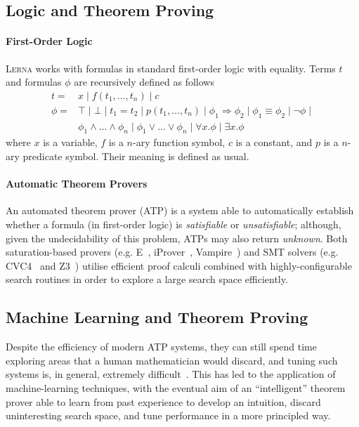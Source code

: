 \documentclass{llncs}
\newcommand{\lerna}{\textsc{Lerna}}
\begin{document}
\subsection{Logic and Theorem Proving}

\paragraph{First-Order Logic}

\lerna{} works with formulas in standard first-order logic with equality. Terms $t$ and formulas $\phi$ are recursively defined as follows
\[
\begin{array}{ll}
t = & x \mid f\left(t_1, \ldots, t_n\right) \mid c \\
\phi  =  & \top \mid \bot \mid t_1 = t_2 \mid p\left(t_1, \ldots, t_n\right) \mid \phi_1 \Rightarrow \phi_2 \mid \phi_1 \equiv \phi_2\mid \neg \phi \mid \\ &   \phi_1 \wedge \ldots \wedge \phi_n \mid \phi_1  \vee \ldots \vee \phi_n \mid \forall x. \phi \mid \exists x. \phi
\end{array}
\]
where $x$ is a variable, $f$ is a $n$-ary function symbol, $c$ is a constant, and $p$ is a $n$-ary predicate symbol. Their meaning is defined as usual.

\paragraph{Automatic Theorem Provers}
An automated theorem prover (ATP) is a system able to automatically establish whether a formula (in first-order logic) is \emph{satisfiable} or \emph{unsatisfiable}; although, given the undecidability of this problem, ATPs may also return \emph{unknown}. Both saturation-based provers (e.g. E~\cite{E}, iProver~\cite{iProver}, Vampire~\cite{Vampire}) and SMT solvers (e.g. CVC4~\cite{CVC4} and Z3~\cite{Z3}) utilise efficient proof calculi combined with highly-configurable search routines in order to explore a large search space efficiently.

\subsection{Machine Learning and Theorem Proving}
Despite the efficiency of modern ATP systems, they can still spend time exploring areas that a human mathematician would discard, and tuning such systems is, in general, extremely difficult~\cite{portfolio}.
This has led to the application of machine-learning techniques, with the eventual aim of an ``intelligent'' theorem prover able to learn from past experience to develop an intuition, discard uninteresting search space, and tune performance in a more principled way.
\end{document}
